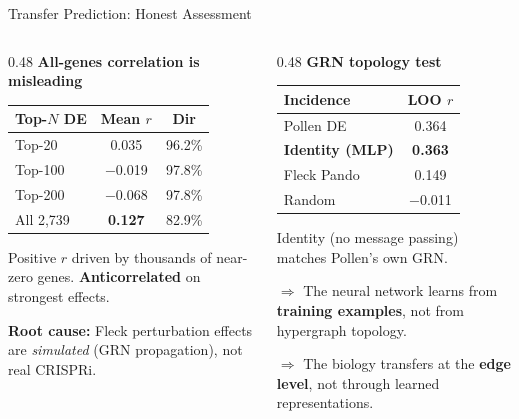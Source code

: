 \documentclass[aspectratio=169,11pt]{beamer}
\begin{document}
\begin{frame}{Transfer Prediction: Honest Assessment}

\begin{columns}[T]
\begin{column}{0.48\textwidth}
\textbf{All-genes correlation is misleading}

\vspace{0.3em}
\begin{table}
\small
\begin{tabular}{lcc}
\toprule
\textbf{Top-$N$ DE} & \textbf{Mean $r$} & \textbf{Dir} \\
\midrule
Top-20 & 0.035 & 96.2\% \\
Top-100 & $-$0.019 & 97.8\% \\
Top-200 & $-$0.068 & 97.8\% \\
All 2{,}739 & \textbf{0.127} & 82.9\% \\
\bottomrule
\end{tabular}
\end{table}

\vspace{0.3em}
Positive $r$ driven by thousands of near-zero genes. \textbf{Anticorrelated} on strongest effects.

\vspace{0.3em}
\textcolor{pandored}{\textbf{Root cause:}} Fleck perturbation effects are \textit{simulated} (GRN propagation), not real CRISPRi.
\end{column}

\begin{column}{0.48\textwidth}
\textbf{GRN topology test}

\vspace{0.3em}
\begin{table}
\small
\begin{tabular}{lc}
\toprule
\textbf{Incidence} & \textbf{LOO $r$} \\
\midrule
Pollen DE & 0.364 \\
\textbf{Identity (MLP)} & \textbf{0.363} \\
Fleck Pando & 0.149 \\
Random & $-$0.011 \\
\bottomrule
\end{tabular}
\end{table}

\vspace{0.3em}
Identity (no message passing) matches Pollen's own GRN.

\vspace{0.3em}
$\Rightarrow$ The neural network learns from \textbf{training examples}, not from hypergraph topology.

\vspace{0.3em}
$\Rightarrow$ The biology transfers at the \textbf{edge level}, not through learned representations.
\end{column}
\end{columns}

\end{frame}
\end{document}
